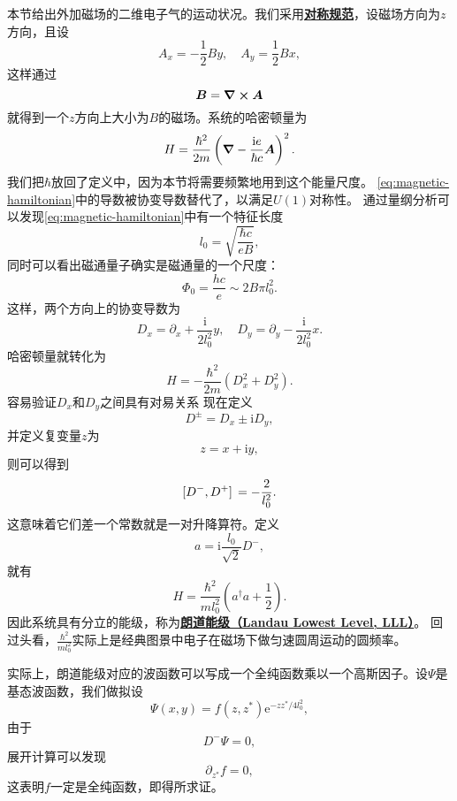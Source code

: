 \documentclass[hyperref, UTF8, a4paper]{ctexart}
\newcommand*{\ii}{\mathrm{i}}
\newcommand*{\ee}{\mathrm{e}}
\newcommand*{\concept}[1]{\underline{\textbf{#1}}}
\begin{document}
本节给出外加磁场的二维电子气的运动状况。我们采用\concept{对称规范}，设磁场方向为$z$方向，且设
\begin{equation}
    A_x = - \frac{1}{2} B y, \quad A_y = \frac{1}{2} B x,
\end{equation}
这样通过
\[
    \vb*{B} = \curl{\vb*{A}}
\]
就得到一个$z$方向上大小为$B$的磁场。系统的哈密顿量为
\begin{equation}
    {H} = \frac{\hbar^2}{2m} \left( \grad - \frac{\ii e}{\hbar c} \vb*{A} \right)^2.
    \label{eq:magnetic-hamiltonian}
\end{equation}
我们把$\hbar$放回了定义中，因为本节将需要频繁地用到这个能量尺度。
\eqref{eq:magnetic-hamiltonian}中的导数被协变导数替代了，以满足$U(1)$对称性。
通过量纲分析可以发现\eqref{eq:magnetic-hamiltonian}中有一个特征长度
\begin{equation}
    l_0 = \sqrt{\frac{\hbar c}{e B}},
\end{equation}
同时可以看出磁通量子确实是磁通量的一个尺度：
\[
    \Phi_0 = \frac{h c}{e} \sim 2 B \pi l_0^2.
\]
这样，两个方向上的协变导数为
\begin{equation}
    D_x = \partial_x + \frac{\ii}{2l_0^2} y, \quad D_y = \partial_y - \frac{\ii}{2l_0^2}x.
\end{equation}
哈密顿量就转化为
\[
    {H} = - \frac{\hbar^2}{2m} (D_x^2 + D_y^2).
\]
容易验证$D_x$和$D_y$之间具有对易关系
现在定义
\begin{equation}
    D^\pm = D_x \pm \ii D_y,
\end{equation}
并定义复变量$z$为
\begin{equation}
    z = x + \ii y,
\end{equation}
则可以得到
\begin{equation}
    \comm*{D^-}{D^+} = - \frac{2}{l_0^2}.
\end{equation}
这意味着它们差一个常数就是一对升降算符。定义
\begin{equation}
    {a} = \ii \frac{l_0}{\sqrt{2}} D^-,
\end{equation}
就有
\begin{equation}
    {H} = \frac{\hbar^2}{m l_0^2} \left({a}^\dagger {a} + \frac{1}{2} \right).
\end{equation}
因此系统具有分立的能级，称为\concept{朗道能级（Landau Lowest Level, LLL）}。
回过头看，$\frac{\hbar^2}{m l_0^2}$实际上是经典图景中电子在磁场下做匀速圆周运动的圆频率。

实际上，朗道能级对应的波函数可以写成一个全纯函数乘以一个高斯因子。设$\Psi$是基态波函数，我们做拟设
\begin{equation}
    \Psi(x, y) = f(z, z^*) \ee^{- z z^* / 4l_0^2},
    \label{eq:landau-wave-packet}
\end{equation}
由于
\[
    D^- \Psi = 0,
\]
展开计算可以发现
\[
    \partial_{z^*} f = 0,
\]
这表明$f$一定是全纯函数，即得所求证。
\end{document}
